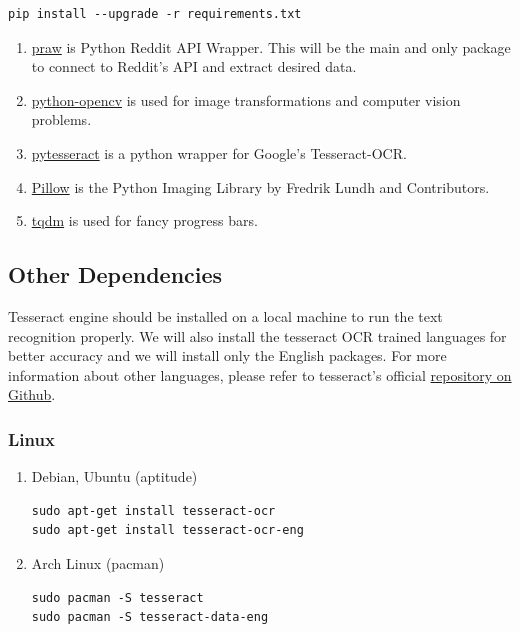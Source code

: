 \documentclass[11pt]{article}
\begin{document}
\begin{verbatim}
pip install --upgrade -r requirements.txt
\end{verbatim}
\begin{enumerate}
\item \href{https://github.com/praw-dev/praw}{praw} is Python Reddit API Wrapper. This will be the main and only package to
connect to Reddit's API and extract desired data.
\item \href{https://pypi.python.org/pypi/opencv-python}{python-opencv} is used for image transformations and computer vision problems.
\item \href{https://pypi.python.org/pypi/pytesseract}{pytesseract} is a python wrapper for Google's Tesseract-OCR.
\item \href{https://pillow.readthedocs.io/en/latest/}{Pillow} is the Python  Imaging Library by Fredrik Lundh and Contributors.
\item \href{https://pypi.python.org/pypi/tqdm}{tqdm} is used for fancy progress bars.
\end{enumerate}

\subsection{Other Dependencies}
\label{sec-1-2}

Tesseract engine should be installed on a local machine to run the text
recognition properly. We will also install the tesseract OCR trained 
languages for better accuracy and we will install only the English 
packages. For more information about other languages, please refer to 
tesseract's official 
\href{https://github.com/tesseract-ocr/tesseract}{repository on Github}.

\subsubsection{Linux}
\label{sec-1-2-1}

\begin{enumerate}
\item Debian, Ubuntu (aptitude)
\label{sec-1-2-1-1}

\begin{verbatim}
sudo apt-get install tesseract-ocr
sudo apt-get install tesseract-ocr-eng
\end{verbatim}

\item Arch Linux (pacman)
\label{sec-1-2-1-2}

\begin{verbatim}
sudo pacman -S tesseract
sudo pacman -S tesseract-data-eng
\end{verbatim}
\end{enumerate}
\end{document}
